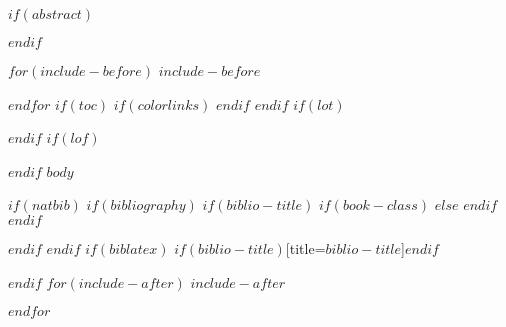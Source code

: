 \documentclass[$if(fontsize)$$fontsize$,$endif$$if(papersize)$$papersize$paper,twoside,$endif$$for(classoption)$$classoption$$sep$,$endfor$]{$documentclass$} %
\begin{document}

$if(abstract)$
\begin{abstract}
$abstract$
\end{abstract}
$endif$

$for(include-before)$
$include-before$

$endfor$
$if(toc)$
{
$if(colorlinks)$
\hypersetup{linkcolor=$if(toccolor)$$toccolor$$else$black$endif$}
$endif$
\setcounter{tocdepth}{$toc-depth$}
\tableofcontents
}
$endif$
$if(lot)$
\listoftables
$endif$
$if(lof)$
\listoffigures
$endif$
\mainmatter
$body$

\backmatter
$if(natbib)$
$if(bibliography)$
$if(biblio-title)$
$if(book-class)$
\renewcommand\bibname{$biblio-title$}
$else$
\renewcommand\refname{$biblio-title$}
$endif$
$endif$


$endif$
$endif$
$if(biblatex)$
\printbibliography$if(biblio-title)$[title=$biblio-title$]$endif$

$endif$
$for(include-after)$
$include-after$

$endfor$
\end{document}
